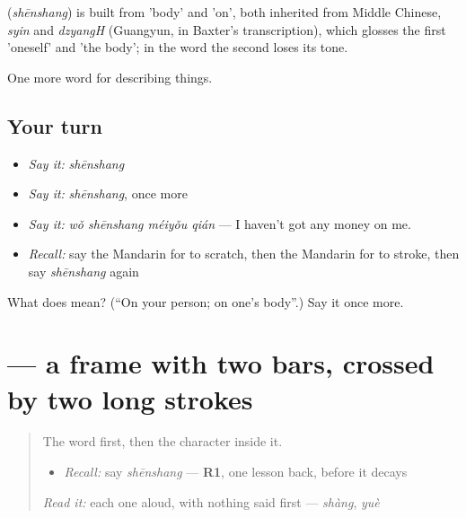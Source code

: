 \begin{cousinweb}
\textbf{} (\emph{shēnshang}) is built from  'body' and  'on', both inherited from Middle Chinese, \emph{syin} and \emph{dzyangH} (Guangyun, in Baxter's transcription), which glosses the first 'oneself' and 'the body'; in the word the second loses its tone.
\end{cousinweb}

\begin{grammarlens}[title={What you've built}]
One more word for describing things.
\end{grammarlens}

\subsection*{Your turn}
\begin{itemize}
\raggedright
  \item \emph{Say it:} \emph{shēnshang}
  \item \emph{Say it:} \emph{shēnshang}, once more
  \item \emph{Say it:} \emph{wǒ shēnshang méiyǒu qián} — I haven't got any money on me.
  \item \emph{Recall:} say the Mandarin for to scratch, then the Mandarin for to stroke, then say \emph{shēnshang} again
\end{itemize}

\begin{tcolorbox}[breakable,colback=teal!4,colframe=teal!35!black,title={Before you move on}]
What does  mean? (\textquotedblleft{}On your person; on one's body\textquotedblright{}.) Say it once more.
\end{tcolorbox}
\section[\texorpdfstring{\zh{身} (shēn)}{身 (shēn)}]{ — a frame with two bars, crossed by two long strokes}

\label{lesson:ZH-W230-shen-body}



\begin{quote}
The word first, then the character inside it.

\begin{itemize}
\raggedright
  \item \emph{Recall:} say \emph{shēnshang} — \textbf{R1}, one lesson back, before it decays
\end{itemize}

\begin{quote}
 
\end{quote}

\emph{Read it:} each one aloud, with nothing said first — \emph{shàng}, \emph{yuè}
\end{quote}

